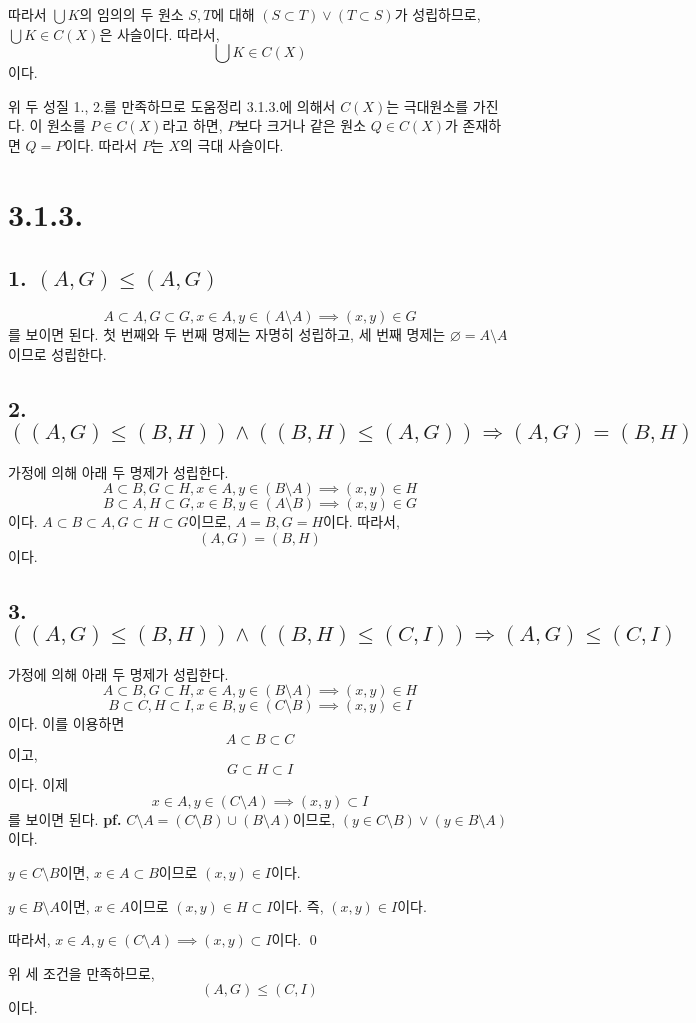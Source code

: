 \documentclass{article}
\begin{document}
따라서 $\bigcup K$의 임의의 두 원소 $S, T$에 대해 $(S \subset T) \vee (T \subset S)$가 성립하므로, $\bigcup K \in C(X)$은 사슬이다. 따라서,
$$\bigcup K \in C(X)$$
이다.

위 두 성질 1., 2.를 만족하므로 도움정리 3.1.3.에 의해서 $C(X)$는 극대원소를 가진다. 이 원소를 $P \in C(X)$라고 하면, $P$보다 크거나 같은 원소 $Q \in C(X)$가 존재하면 $Q = P$이다. 따라서 $P$는 $X$의 극대 사슬이다.

\section{3.1.3.}
\subsection{1. $(A, G) \le (A, G)$}
$$A \subset A, G \subset G, x \in A, y \in (A \setminus A) \implies (x, y) \in G$$
를 보이면 된다. 첫 번째와 두 번째 명제는 자명히 성립하고, 세 번째 명제는 $\varnothing = A \setminus A$이므로 성립한다.
\subsection{2. $\left((A, G) \le (B, H)\right) \wedge \left((B, H) \le (A, G)\right) \Rightarrow (A, G) = (B, H)$}
가정에 의해 아래 두 명제가 성립한다.
$$A \subset B, G \subset H, x \in A, y \in (B \setminus A) \implies (x, y) \in H$$
$$B \subset A, H \subset G, x \in B, y \in (A \setminus B) \implies (x, y) \in G$$
이다. $A \subset B \subset A, G \subset H \subset G$이므로, $A = B, G = H$이다. 따라서, 
$$(A, G) = (B, H)$$이다.

\subsection{3. $\left((A, G) \le (B, H)\right) \wedge \left((B, H) \le (C, I)\right) \Rightarrow (A, G) \le (C, I)$}
가정에 의해 아래 두 명제가 성립한다.
$$A \subset B, G \subset H, x \in A, y \in (B \setminus A) \implies (x, y) \in H$$
$$B \subset C, H \subset I, x \in B, y \in (C \setminus B) \implies (x, y) \in I$$
이다. 이를 이용하면
$$A \subset B \subset C$$이고, $$G \subset H \subset I$$이다.
이제 $$x \in A, y \in (C \setminus A) \implies (x, y) \subset I$$를 보이면 된다.
\textbf{pf.} $C \setminus A = (C \setminus B) \cup (B \setminus A)$이므로, $(y \in C \setminus B) \vee (y \in B \setminus A)$이다.

$y \in C \setminus B$이면, $x \in A \subset B$이므로 $(x, y) \in I$이다.

$y \in B \setminus A$이면, $x \in A$이므로 $(x, y) \in H \subset I$이다. 즉, $(x, y) \in I$이다.

따라서, $x \in A, y \in (C \setminus A) \implies (x, y) \subset I$이다. \qed

위 세 조건을 만족하므로, $$(A, G) \le (C, I)$$이다.
\end{document}
